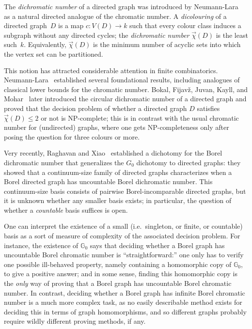 The \emph{dichromatic number} of a directed graph was introduced by Neumann-Lara~\cite{NeumannLara1982} as a natural directed analogue of the chromatic number.
A \emph{dicolouring} of a directed graph~$D$ is a map $c\colon V(D)\to k$ such that every colour class induces a subgraph without any directed cycles; the \emph{dichromatic number} $\vec\chi(D)$ is the least such~$k$.
Equivalently, $\vec\chi(D)$ is the minimum number of acyclic sets into which the vertex set can be partitioned.

This notion has attracted considerable attention in finite combinatorics.
Neumann-Lara~\cite{NeumannLara1982} established several foundational results, including analogues of classical lower bounds for the chromatic number.
Bokal, Fijavž, Juvan, Kayll, and Mohar~\cite{Bokal_2004_CircularChrom} later introduced the circular dichromatic number of a directed graph and proved that the decision problem of whether a directed graph $D$ satisfies $\vec\chi(D)\leq 2$ or not is NP-complete; this is in contrast with the usual chromatic number for (undirected) graphs, where one gets NP-completeness only after posing the question for three colours or more.

Very recently, Raghavan and Xiao~\cite{RaghavanXiao2024} established a dichotomy for the Borel dichromatic number that generalizes the $G_0$ dichotomy to directed graphs: they showed that a continuum-size family of directed graphs characterizes when a Borel directed graph has uncountable Borel dichromatic number.
This continuum-size basis consists of pairwise Borel-incomparable directed graphs, but it is unknown whether any smaller basis exists; in particular, the question of whether a \emph{countable} basis suffices is open.

One can interpret the existence of a small (i.e.\ singleton, or finite, or countable) basis as a sort of measure of complexity of the associated decision problem.
For instance, the existence of $\mathbb{G}_0$ says that deciding whether a Borel graph has uncountable Borel chromatic number is ``straightforward:'' one only has to verify one possible ill-behaved property, namely containing a homomorphic copy of $\mathbb{G}_0$, to give a positive answer; and in some sense, finding this homomorphic copy is the \emph{only} way of proving that a Borel graph has uncountable Borel chromatic number.
In contrast, deciding whether a Borel graph has infinite Borel chromatic number is a much more complex task, as no easily describable method exists for deciding this in terms of graph homomorphisms, and so different graphs probably require wildly different proving methods, if any.


